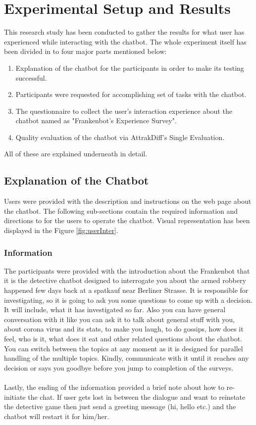 \section{Experimental Setup and Results}
This research study has been conducted to gather the results for what user has experienced while interacting with the chatbot. The whole experiment itself has been divided in to four major parts mentioned below:
\begin{enumerate}
    \item Explanation of the chatbot for the participants in order to make its testing successful.
    \item Participants were requested for accomplishing set of tasks with the chatbot.
    \item The questionnaire to collect the user's interaction experience about the chatbot named as "Frankenbot's Experience Survey".
    \item Quality evaluation of the chatbot via AttrakDiff's Single Evaluation.
\end{enumerate} 
All of these are explained underneath in detail.

\subsection{Explanation of the Chatbot}
Users were provided with the description and instructions on the web page about the chatbot. The following sub-sections contain the required information and directions to for the users to operate the chatbot. Visual representation has been displayed in the Figure \ref{fig:userInter}.

\subsubsection*{Information}
The participants were provided with the introduction about the Frankenbot that it is the detective chatbot designed to interrogate you about the armed robbery happened few days back at a spatkauf near Berliner Strasse. It is responsible for investigating, so it is going to ask you some questions to come up with a decision. It will include, what it has investigated so far. Also you can have general conversation with it like you can ask it to talk about general stuff with you, about corona virus and its stats, to make you laugh, to do gossips, how does it feel, who is it, what does it eat and other related questions about the chatbot. You can switch between the topics at any moment as it is designed for parallel handling of the multiple topics. Kindly, communicate with it until it reaches any decision or says you goodbye before you jump to completion of the surveys.
\\~\\
Lastly, the ending of the information provided a brief note about how to re-initiate the chat. If user gets lost in between the dialogue and want to reinstate the detective game then just send a greeting message (hi, hello etc.) and the chatbot will restart it for him/her.

